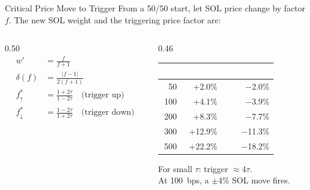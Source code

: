 \documentclass[aspectratio=169,10pt]{beamer}
\begin{document}
\begin{frame}{Critical Price Move to Trigger}
\vspace{0.1em}
{\small\color{BodyText}
From a 50/50 start, let SOL price change by factor $f$.
The new SOL weight and the triggering price factor are:}

\vspace{0.2em}
\small
\begin{columns}[T]
\begin{column}{0.50\textwidth}
\begin{align*}
  w' &= \frac{f}{f+1} \\[0.3em]
  \delta(f) &= \frac{|f-1|}{2(f+1)} \\[0.5em]
  f^*_{\uparrow} &= \frac{1+2\tau}{1-2\tau}
    \quad\text{(trigger up)} \\[0.3em]
  f^*_{\downarrow} &= \frac{1-2\tau}{1+2\tau}
    \quad\text{(trigger down)}
\end{align*}
\end{column}
\begin{column}{0.46\textwidth}
\vspace{0.2em}
\begin{tabular}{@{}r r r@{}}
\toprule
\rowcolor{Navy}
  \textcolor{white}{\textbf{bps}} &
  \textcolor{white}{\textbf{SOL up}} &
  \textcolor{white}{\textbf{SOL down}} \\
\midrule
 50 &  +2.0\% &  $-$2.0\% \\
100 &  +4.1\% &  $-$3.9\% \\
200 &  +8.3\% &  $-$7.7\% \\
300 & +12.9\% & $-$11.3\% \\
500 & +22.2\% & $-$18.2\% \\
\bottomrule
\end{tabular}
\vspace{0.3em}

{\scriptsize\color{MutedText}
For small $\tau$: trigger $\approx 4\tau$.\\
At 100~bps, a $\pm$4\% SOL move fires.}
\end{column}
\end{columns}
\end{frame}
\end{document}
